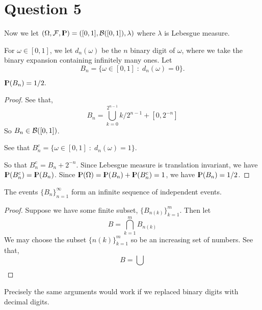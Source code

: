 \documentclass{unswmaths}
\begin{document}
\section*{Question 5}
Now we let $(\Omega,\mathcal{F},{\rm I\kern-.3em P}) = ([0,1],\mathcal{B}([0,1]),\lambda)$
where $\lambda$ is Lebesgue measure.

For $\omega \in [0,1]$, we let $d_n(\omega)$ be the $n$ binary digit
of $\omega$, where we take the binary expansion containing infinitely many ones.
Let 
\begin{equation*}
    B_n = \{\omega \in [0,1]\;:\;d_n(\omega) = 0\}.
\end{equation*}

\begin{lemma}
    ${\rm I\kern-.3em P}(B_n) = 1/2.$
\end{lemma}
\begin{proof}
    See that,
    \begin{equation*}
        B_n = \bigcup_{k=0}^{2^{n-1}}k/2^{n-1}+[0,2^{-n}]
    \end{equation*}
    So $B_n \in \mathcal{B}([0,1])$.


    See that $B_n^c = \{\omega \in [0,1]\;:\;d_n(\omega) = 1\}$.
    
    So that $B_n^c = B_n+2^{-n}$. Since Lebesgue measure
    is translation invariant, we have ${\rm I\kern-.3em P}(B_n^c) = {\rm I\kern-.3em P}(B_n)$.
    Since ${\rm I\kern-.3em P}(\Omega) = {\rm I\kern-.3em P}(B_n)+{\rm I\kern-.3em P}(B_n^c) = 1$,
    we have ${\rm I\kern-.3em P}(B_n) = 1/2$.
\end{proof}

\begin{lemma}
    The events $\{B_n\}_{n=1}^\infty$ form an infinite sequence of independent
    events.
\end{lemma}
\begin{proof}
    Suppose we have some finite subset, $\{B_{n(k)}\}_{k=1}^m$. Then let
    \begin{equation*}
        B = \bigcap_{k=1}^m B_{n(k)}
    \end{equation*}
    We may choose the subset $\{n(k)\}_{k=1}^m$ so be an increasing
    set of numbers.
    See that,
    \begin{equation*}
        B = \bigcup_{}
    \end{equation*}
\end{proof}

\begin{remark}
    Precisely the same arguments would work if we replaced
    binary digits with decimal digits.
\end{remark}
\end{document}
